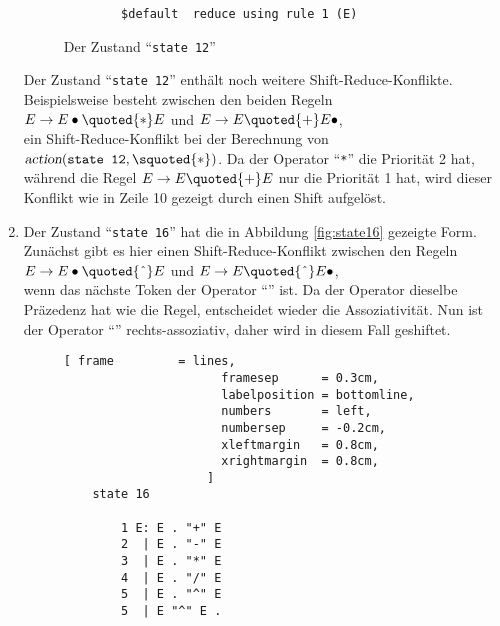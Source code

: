 \begin{enumerate}
\begin{figure}[!ht]
\begin{Verbatim}
        $default  reduce using rule 1 (E)
    \end{Verbatim} 
    \vspace*{-0.3cm}
    \caption{Der Zustand ``\texttt{state 12}''}
    \label{fig:state12}
  \end{figure}
        Der Zustand ``\texttt{state 12}'' enth\"alt noch weitere Shift-Reduce-Konflikte.
        Beispielsweise besteht zwischen den beiden Regeln
        \\[0.2cm]
        \hspace*{1.3cm}
        $E \rightarrow E \bullet \quoted{*} E$ \quad und \quad
        $E \rightarrow E \quoted{+} E \bullet$, 
        \\[0.2cm]
        ein Shift-Reduce-Konflikt bei der Berechnung von $\textsl{action}(\texttt{state 12}, \squoted{*})$.
        Da der Operator ``\texttt{*}'' die Priorit\"at 2 hat, w\"ahrend die Regel $E \rightarrow E \quoted{+} E$
        nur die Priorit\"at 1 hat, wird dieser Konflikt wie in Zeile 10 gezeigt durch einen Shift aufgel\"ost.
\item Der Zustand ``\texttt{state 16}'' hat die in Abbildung \ref{fig:state16} gezeigte Form.
      Zun\"achst gibt es hier einen Shift-Reduce-Konflikt zwischen den Regeln
      \\[0.2cm]
      \hspace*{1.3cm}
      $E \rightarrow E \bullet \quoted{\symbol{94}} E$ \quad und \quad
      $E \rightarrow E \quoted{\symbol{94}} E  \bullet$,
      \\[0.2cm]
      wenn das n\"achste Token der Operator ``\texttt{}'' ist.  Da der Operator dieselbe Pr\"azedenz
      hat wie die Regel, entscheidet wieder die Assoziativit\"at.  Nun ist der Operator
      ``\texttt{}'' rechts-assoziativ, daher wird in diesem Fall geshiftet.

    \begin{figure}[!ht]
    \centering
    \begin{Verbatim}[ frame         = lines, 
                      framesep      = 0.3cm, 
                      labelposition = bottomline,
                      numbers       = left,
                      numbersep     = -0.2cm,
                      xleftmargin   = 0.8cm,
                      xrightmargin  = 0.8cm,
                    ]
    state 16
    
        1 E: E . "+" E
        2  | E . "-" E
        3  | E . "*" E
        4  | E . "/" E
        5  | E . "^" E
        5  | E "^" E .
    

\end{Verbatim}
\end{figure}
\end{enumerate}
